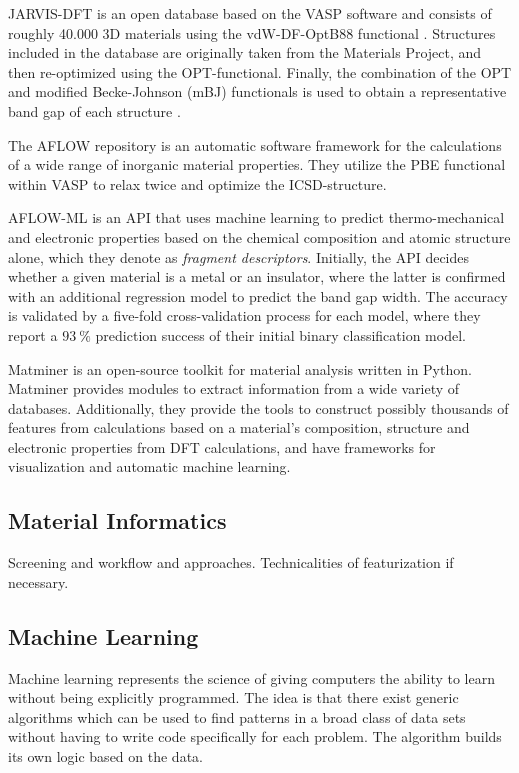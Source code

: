 \documentclass[superscriptaddress,unsortedaddress,
 amsmath,amssymb,
 aps,
]{revtex4-2}
\begin{document}
JARVIS-DFT \cite{Choudhary2020} is an open database based on the VASP software and consists of roughly 40.000 3D materials using the vdW-DF-OptB88 functional \cite{Thonhauser2007, Klimes2011}. Structures included in the database are originally taken from the Materials Project, and then re-optimized using the OPT-functional. Finally, the combination of the OPT and modified Becke-Johnson (mBJ) functionals is used to obtain a representative band gap of each structure \cite{Choudhary2018a}. 

The AFLOW \cite{Curtarolo2012, Curtarolo2012a, Calderon2015} repository is an automatic software framework for the calculations of a wide range of inorganic material properties. They utilize the PBE functional within VASP
to relax twice and optimize the ICSD-structure. 

AFLOW-ML \cite{Isayev2017} is an API that uses machine learning to predict thermo-mechanical and electronic properties based on the chemical composition and atomic structure alone, which they denote as \textit{fragment descriptors}. Initially, the API decides whether a given material is a metal or an insulator, where the latter is confirmed with an additional regression model to predict the band gap width. The accuracy is validated by a five-fold cross-validation process for each model, where they report a $93 \ \%$ prediction success of their initial binary classification model. 

Matminer \cite{Ward2018} is an open-source toolkit for material analysis written in Python. Matminer provides modules to extract information from a wide variety of databases. Additionally, they provide the tools to construct possibly thousands of features from calculations based on a material's composition, structure and electronic properties from DFT calculations, and have frameworks for visualization and automatic machine learning.

\subsection*{Material Informatics}  
Screening and workflow and approaches. Technicalities of featurization if necessary. 

\subsection*{Machine Learning} 

Machine learning  represents the science of giving computers the ability to learn without being explicitly programmed. The idea is that there exist generic algorithms which can be used to find patterns in a broad class of data sets without having to write code specifically for each problem. The algorithm builds its own logic based on the data. 
\end{document}

